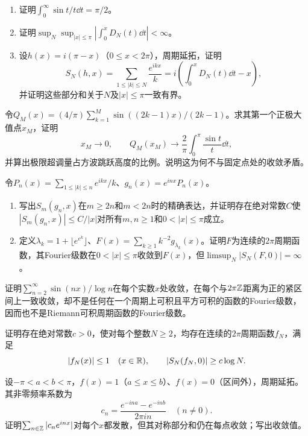 \begin{enumerate}[label=(\arabic*)]
\item 证明$\int_0^\infty\sin t/t\dd t=\pi/2$。
\item 证明$\sup_N\sup_{|x|\le\pi}|\int_0^xD_N(t)\dd t|<\infty$。
\item 设$h(x)=i(\pi-x)$（$0\le x<2\pi$），周期延拓，证明
\[
 S_N(h,x)=\sum_{1\le|k|\le N}\frac{e^{ikx}}k
 =i\left(\int_0^xD_N(t)\dd t-x\right),
\]
并证明这些部分和关于$N$及$|x|\le\pi$一致有界。
\end{enumerate}

令$Q_M(x)=(4/\pi)\sum_{k=1}^M\sin((2k-1)x)/(2k-1)$。求其第一个正极大值点$x_M$，证明
\[
 x_M\to0,\qquad Q_M(x_M)\to\frac2\pi\int_0^\pi\frac{\sin t}{t}\dd t,
\]
并算出极限超调量占方波跳跃高度的比例。说明这为何不与固定点处的收敛矛盾。

令$P_n(x)=\sum_{1\le|k|\le n}e^{ikx}/k$、$g_n(x)=e^{inx}P_n(x)$。
\begin{enumerate}[label=(\arabic*)]
\item 写出$S_m(g_n,x)$在$m\ge2n$和$m<2n$时的精确表达，并证明存在绝对常数$C$使
$|S_m(g_n,x)|\le C/|x|$对所有$m,n\ge1$和$0<|x|\le\pi$成立。
\item 定义$\lambda_k=1+\lfloor e^{e^k}\rfloor$、$F(x)=\sum_{k\ge1}k^{-2}g_{\lambda_k}(x)$。证明$F$为连续的$2\pi$周期函数，其Fourier级数在$0<|x|\le\pi$收敛到$F(x)$，但$\limsup_N|S_N(F,0)|=\infty$。
\end{enumerate}

证明$\sum_{n=2}^\infty\sin(nx)/\log n$在每个实数$x$处收敛，在每个与$2\pi\mathbb Z$距离为正的紧区间上一致收敛，却不是任何在一个周期上可积且平方可积的函数的Fourier级数，因而也不是Riemann可积周期函数的Fourier级数。


证明存在绝对常数$c>0$，使对每个整数$N\ge2$，均存在连续的$2\pi$周期函数$f_N$，满足
\[
 |f_N(x)|\le1\quad(x\in\mathbb R),\qquad |S_N(f_N,0)|\ge c\log N.
\]

设$-\pi<a<b<\pi$，$f(x)=1$（$a\le x\le b$）、$f(x)=0$（区间外），周期延拓。其非零频率系数为
\[
 c_n=\frac{e^{-ina}-e^{-inb}}{2\pi in}\quad(n\ne0).
\]
证明$\sum_{n\in\mathbb Z}|c_ne^{inx}|$对每个$x$都发散，但其对称部分和仍在每点收敛；写出收敛值。

